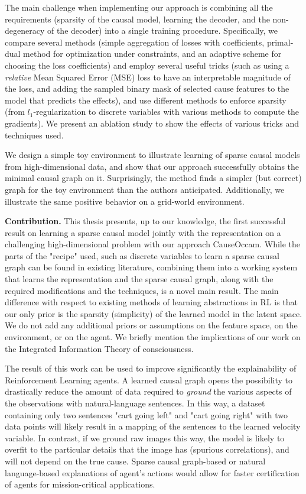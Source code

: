 \documentclass[a4paper,11pt,oneside]{report}
\newcommand{\sysname}{CauseOccam\xspace}
\begin{document}
The main challenge when implementing our approach is combining all the requirements (sparsity of the causal model, learning the decoder, and the non-degeneracy of the decoder) into a single training procedure. Specifically, we compare several methods (simple aggregation of losses with coefficients, primal-dual method for optimization under constraints, and an adaptive scheme for choosing the loss coefficients) and employ several useful tricks (such as using a {\em relative} Mean Squared Error (MSE) loss to have an interpretable magnitude of the loss, and adding the sampled binary mask of selected cause features to the model that predicts the effects), and use different methods to enforce sparsity (from $l_1$-regularization to discrete variables with various methods to compute the gradients). We present an ablation study to show the effects of various tricks and techniques used.

We design a simple toy environment to illustrate learning of sparse causal models from high-dimensional data, and show that our approach successfully obtains the minimal causal graph on it. Surprisingly, the method finds a simpler (but correct) graph for the toy environment than the authors anticipated.
Additionally, we illustrate the same positive behavior on a grid-world environment.

{\bf Contribution.} This thesis presents, up to our knowledge, the first successful result on learning a sparse causal model jointly with the representation on a challenging high-dimensional problem with our approach \sysname. While the parts of the "recipe" used, such as discrete variables to learn a sparse causal graph can be found in existing literature, combining them into a working system that learns the representation and the sparse causal graph, along with the required modifications and the techniques, is a novel main result. The main difference with respect to existing methods of learning abstractions in RL is that our only prior is the sparsity (simplicity) of the learned model in the latent space. We do not add any additional priors or assumptions \cite{Francois-Lavet2018,Ying2020} on the feature space, on the environment, or on the agent. We briefly mention the implications of our work on the Integrated Information Theory \cite{Tononi2016} of consciousness.

The result of this work can be used to improve significantly the explainability of Reinforcement Learning agents. A learned causal graph opens the possibility to drastically reduce the amount of data required to {\em ground} \cite{Lahlou2019,Hui2020} the various aspects of the observations with natural-language sentences.
In this way, a dataset containing only two sentences "cart going left" and "cart going right" with two data points will likely result in a mapping of the sentences to the learned velocity variable. In contrast, if we ground raw images this way, the model is likely to overfit to the particular details that the image has (spurious correlations), and will not depend on the true cause.
Sparse causal graph-based or natural language-based explanations \cite{Madumal2019,Ehsan2018,Abramson2020} of agent's actions would allow for faster certification of agents for mission-critical applications.
\end{document}
